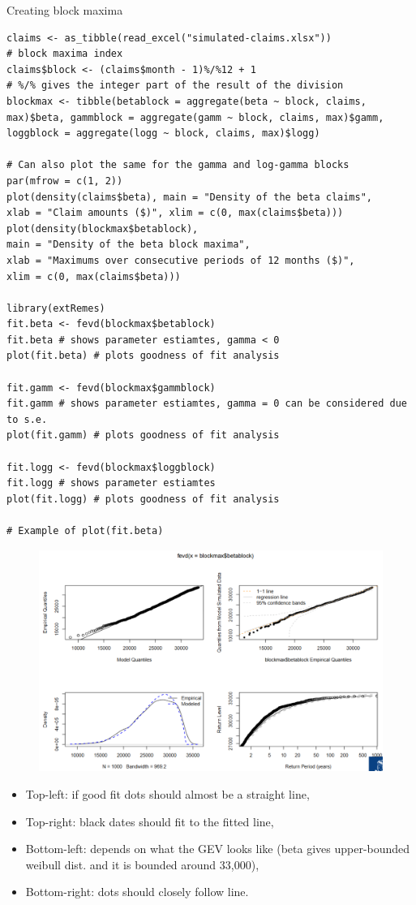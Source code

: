 \documentclass[11pt]{article}
\newcommand{\noi}{\noindent}
\begin{document}
\noi Creating block maxima
\begin{lstlisting}
claims <- as_tibble(read_excel("simulated-claims.xlsx"))
# block maxima index
claims$block <- (claims$month - 1)%/%12 + 1
# %/% gives the integer part of the result of the division
blockmax <- tibble(betablock = aggregate(beta ~ block, claims,
max)$beta, gammblock = aggregate(gamm ~ block, claims, max)$gamm,
loggblock = aggregate(logg ~ block, claims, max)$logg)

# Can also plot the same for the gamma and log-gamma blocks
par(mfrow = c(1, 2))
plot(density(claims$beta), main = "Density of the beta claims",
xlab = "Claim amounts ($)", xlim = c(0, max(claims$beta)))
plot(density(blockmax$betablock),
main = "Density of the beta block maxima",
xlab = "Maximums over consecutive periods of 12 months ($)",
xlim = c(0, max(claims$beta)))

library(extRemes)
fit.beta <- fevd(blockmax$betablock)
fit.beta # shows parameter estiamtes, gamma < 0 
plot(fit.beta) # plots goodness of fit analysis

fit.gamm <- fevd(blockmax$gammblock)
fit.gamm # shows parameter estiamtes, gamma = 0 can be considered due to s.e.
plot(fit.gamm) # plots goodness of fit analysis

fit.logg <- fevd(blockmax$loggblock)
fit.logg # shows parameter estiamtes
plot(fit.logg) # plots goodness of fit analysis

# Example of plot(fit.beta)
\end{lstlisting}
\begin{figure}[H]
    \centering
    \includegraphics[width=0.9\linewidth]{block maxima diag plots beta.png}
\end{figure}
\begin{itemize}
    \item Top-left: if good fit dots should almost be a straight line,
    \item Top-right: black dates should fit to the fitted line,
    \item Bottom-left: depends on what the GEV looks like (beta gives upper-bounded weibull dist. and it is bounded around 33,000),
    \item Bottom-right: dots should closely follow line.
\end{itemize}
\end{document}
